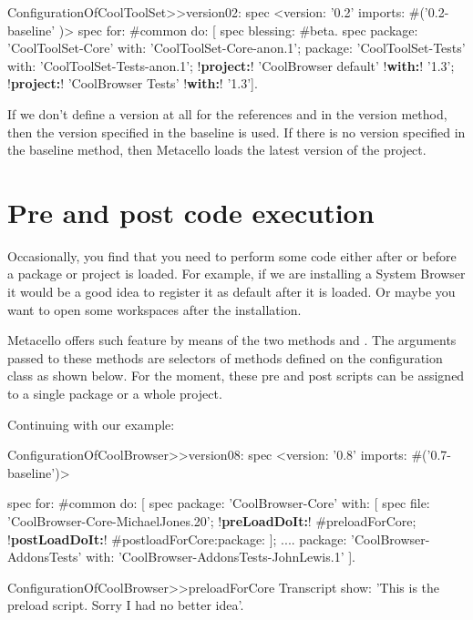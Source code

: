 \documentclass[a4paper,10pt,twoside]{book}
\begin{document}
\begin{code}{}
ConfigurationOfCoolToolSet>>version02: spec 
	<version: '0.2' imports: #('0.2-baseline' )>
	spec for: #common do: [
		spec blessing: #beta.
		spec 
			package: 'CoolToolSet-Core' with: 'CoolToolSet-Core-anon.1';
			package: 'CoolToolSet-Tests' with: 'CoolToolSet-Tests-anon.1';
			!\textbf{project:}! 'CoolBrowser default' !\textbf{with:}! '1.3';
			!\textbf{project:}! 'CoolBrowser Tests' !\textbf{with:}! '1.3'].
\end{code}

If we don't define a version at all for the references   and  in the version method, then the version specified in the baseline is used. If there is no version specified in the baseline method, then Metacello loads the latest version of the project.

\section{Pre and post code execution}

Occasionally, you find that you need to perform some code either after or before a package or project is loaded. For example, if we are installing a System Browser it would be a good idea to register it as default after it is loaded. Or maybe you want to open some workspaces after the installation. 

Metacello offers such feature by means of the two methods  and .  The arguments passed to these methods are selectors of methods defined on the configuration class as shown below. For the moment, these pre and post scripts can be assigned to a single package or a whole project. 

Continuing with our example:

\begin{code}{}
ConfigurationOfCoolBrowser>>version08: spec 
	<version: '0.8' imports: #('0.7-baseline')>
	
	spec for: #common do: [
		spec 
			package: 'CoolBrowser-Core' with: [
				spec 
					file: 'CoolBrowser-Core-MichaelJones.20';
					!\textbf{preLoadDoIt:}! #preloadForCore;
					!\textbf{postLoadDoIt:}! #postloadForCore:package: ];
			....
			package: 'CoolBrowser-AddonsTests' with: 'CoolBrowser-AddonsTests-JohnLewis.1' ].
\end{code}

\begin{code}{}
ConfigurationOfCoolBrowser>>preloadForCore
  	Transcript show: 'This is the preload script. Sorry I had no better idea'. 
\end{code}
\end{document}
